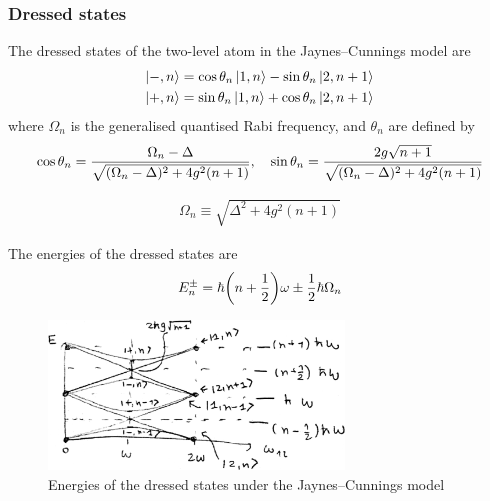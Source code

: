 \subsubsection*{Dressed states}
The dressed states of the two-level atom in the Jaynes--Cunnings model are
\begin{subequations}
\begin{align}
	\ket{-,n} &= \cos \theta_{n} \ket{1,n} - \sin \theta_{n} \ket{2,n+1} \\
	\ket{+,n} &= \sin \theta_{n} \ket{1,n} + \cos \theta_{n} \ket{2,n+1}
\end{align}
\end{subequations}
where $\Omega_{n}$ is the generalised quantised Rabi frequency, and $\theta_{n}$ are defined by
\begin{align*}
	\cos \theta_{n} = \frac{\Omega_{n} - \Delta}{\sqrt{(\Omega_{n} - \Delta)^{2} + 4 g^{2} (n+1)}} \qc \sin \theta_{n} = \frac{2 g \sqrt{n+1}}{\sqrt{(\Omega_{n} - \Delta)^{2} + 4 g^{2} (n+1)}}
\end{align*}

\begin{defi}
	\begin{align}
		\Omega_{n} \equiv \sqrt{\Delta^{2} + 4 g^{2} (n+1)}
	\end{align}
\end{defi}

The energies of the dressed states are
\begin{align}
	E_{n}^{\pm} = \hbar \qty(n + \frac{1}{2}) \omega \pm \frac{1}{2} \hbar \Omega_{n}
\end{align}

\begin{figure}[H]
	\centering
	\includegraphics[width=0.7\textwidth]{./images/5-jc-energies}
	\caption{Energies of the dressed states under the Jaynes--Cunnings model}
	\label{fig:jc-energies}
\end{figure}


